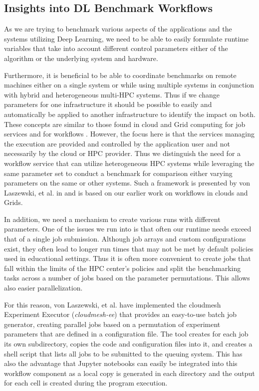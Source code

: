 \documentclass[utf8]{FrontiersinVancouver} %
\begin{document}
\subsection{Insights into DL Benchmark Workflows}
\label{sec:workflow-main}

As we are trying to benchmark various aspects of the applications and the systems utilizing Deep Learning, we need to be able to easily formulate runtime variables that take into account different control parameters either of the algorithm or the underlying system and hardware.

Furthermore, it is beneficial to be able to coordinate benchmarks on remote machines either on a single system or while using multiple systems in conjunction with hybrid and heterogeneous multi-HPC systems. 
Thus if we change parameters for one infrastructure it should be possible to easily and automatically be applied to another infrastructure to identify the impact on both.
These concepts are similar to those found in cloud and Grid computing for job services \citep{las-infogram} and for workflows \citep{las-workflow,las07-workflow}. However, the focus here is that the services managing the execution are provided and controlled by the application user and not necessarily by the cloud or HPC provider. Thus we distinguish the need for a workflow service that can utilize heterogeneous HPC systems while leveraging the same parameter set to conduct a benchmark for comparison either varying parameters on the same or other systems. Such a framework is presented by von Laszewski, et al. in \citep{las-22-arxiv-workflow-cc,las-2023-escience} and is based on our earlier work on workflows in clouds and Grids.

In addition, we need a mechanism to create various runs with different parameters. One of the issues we run into is that often our runtime needs exceed that of a single job submission. Although job arrays and custom configurations exist, they often lead to longer run times that may not be met by default policies used in educational settings. Thus it is often more convenient to create jobs that fall within the limits of the HPC center's policies and split the benchmarking tasks across a number of jobs based on the parameter permutations. This allows also easier parallelization.

For this reason, von Laszewski, et al. have implemented the cloudmesh Experiment Executor ({\it cloudmesh-ee}) that provides an easy-to-use batch job generator, creating parallel jobs based on a permutation of experiment parameters that are defined in a configuration file. The tool creates for each job its own subdirectory, copies the code and configuration files into it, and creates a shell script that lists all jobs to be submitted to the queuing system. This has also the advantage that Jupyter notebooks can easily be integrated into this workflow component as a local copy is generated in each directory and the output for each cell is created during the program execution.
\end{document}
